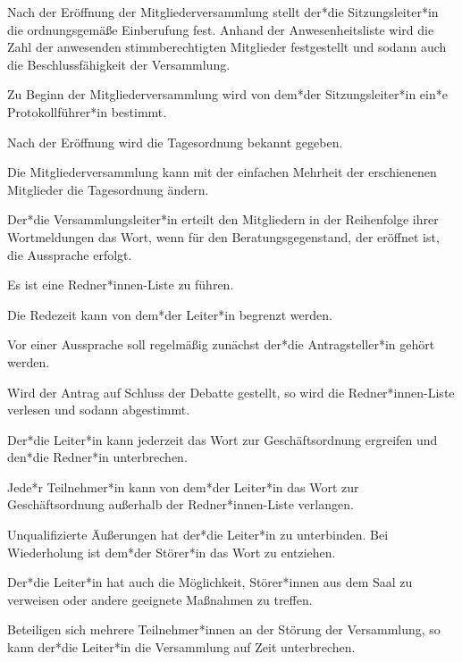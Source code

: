 \begin{gfmitglieder}
  Nach der Eröffnung der Mitgliederversammlung stellt der*die Sitzungsleiter*in die ordnungsgemä\ss{}e Einberufung fest. Anhand der Anwesenheitsliste wird die Zahl der anwesenden stimmberechtigten Mitglieder festgestellt und sodann auch die Beschlussfähigkeit der Versammlung.

  Zu Beginn der Mitgliederversammlung wird von dem*der Sitzungsleiter*in ein*e Protokollführer*in bestimmt.


  Nach der Eröffnung wird die Tagesordnung bekannt gegeben.

  Die Mitgliederversammlung kann mit der einfachen Mehrheit der erschienenen Mitglieder die Tagesordnung ändern.


  Der*die Versammlungsleiter*in erteilt den Mitgliedern in der Reihenfolge ihrer Wortmeldungen das Wort, wenn für den Beratungsgegenstand, der eröffnet ist, die Aussprache erfolgt.

  Es ist eine Redner*innen-Liste zu führen.

  Die Redezeit kann von dem*der Leiter*in begrenzt werden.

  Vor einer Aussprache soll regelmä\ss{}ig zunächst der*die Antragsteller*in gehört werden.

  Wird der Antrag auf Schluss der Debatte gestellt, so wird die Redner*innen-Liste verlesen und sodann abgestimmt.


  Der*die Leiter*in kann jederzeit das Wort zur Geschäftsordnung ergreifen und den*die Redner*in unterbrechen.

  Jede*r Teilnehmer*in kann von dem*der Leiter*in das Wort zur Geschäftsordnung au\ss{}erhalb der Redner*innen-Liste verlangen.


  Unqualifizierte Äu\ss{}erungen hat der*die Leiter*in zu unterbinden. Bei Wiederholung ist dem*der Störer*in das Wort zu entziehen.

  Der*die Leiter*in hat auch die Möglichkeit, Störer*innen aus dem Saal zu verweisen oder andere geeignete Ma\ss{}nahmen zu treffen.

  Beteiligen sich mehrere Teilnehmer*innen an der Störung der Versammlung, so kann der*die Leiter*in die Versammlung auf Zeit unterbrechen.


\end{gfmitglieder}
